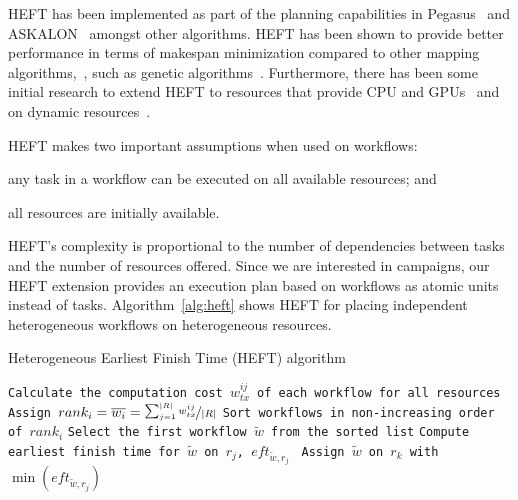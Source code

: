 HEFT has been implemented as part of the planning capabilities in Pegasus~\cite{deelman2015pegasus} and ASKALON~\cite{fahringer2005askalon} amongst other algorithms.
HEFT has been shown to provide better performance in terms of makespan minimization compared to other mapping algorithms,~\cite{topcuoglu2002performance,canon2008comparative}, such as genetic algorithms~\cite{fahringer2005askalon}. 
Furthermore, there has been some initial research to extend HEFT to resources that provide CPU and GPUs~\cite{shetti2013optimization} and on dynamic resources~\cite{dong2007pfas}. 

HEFT makes two important assumptions when used on workflows: 
\begin{inparaenum}[(1)] 
    \item any task in a workflow can be executed on all available resources; and 
    \item all resources are initially available.
\end{inparaenum}
HEFT's complexity is proportional to the number of dependencies between tasks and the number of resources offered. 
Since we are interested in campaigns, our HEFT extension provides an execution plan based on workflows as atomic units instead of tasks.
Algorithm~\ref{alg:heft} shows HEFT for placing independent heterogeneous workflows on heterogeneous resources.

\begin{algorithm}[ht]
    \caption{Heterogeneous Earliest Finish Time (HEFT) algorithm}
    \label{alg:heft}
    \begin{algorithmic}[1]
        \State \texttt{Calculate the computation cost $w_{tx}^{ij}$ of each workflow for all resources}
        \State \texttt{Assign $rank_i = \overline{w_{i}} = \nicefrac{\sum_{j=1}^{|R|}w_{tx}^{ij}}{|R|}$}
        \State \texttt{Sort workflows in non-increasing order of $rank_i$}
        \State \texttt{Select the first workflow $\tilde{w}$ from the sorted list}
        \State\texttt{Compute earliest finish time for $\tilde{w}$ on $r_{j}$, $eft_{\tilde{w},r_j}$ }
        \EndFor
        \State \texttt{Assign  $\tilde{w}$ on $r_k$ with $\min{(eft_{\tilde{w},r_j})}$}
        \EndWhile
        \EndProcedure
    \end{algorithmic}
\end{algorithm}


